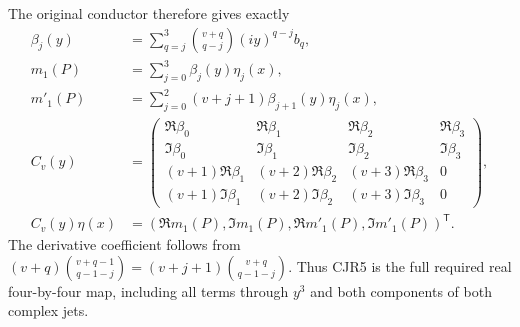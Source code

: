 The original conductor therefore gives exactly
\[
 \begin{split}
 \beta_j(y)&=\sum_{q=j}^3\binom{v+q}{q-j}(iy)^{q-j}b_q,\\
 m_1(P)&=\sum_{j=0}^3\beta_j(y)\eta_j(x),\\
 m'_1(P)&=\sum_{j=0}^2(v+j+1)\beta_{j+1}(y)\eta_j(x),\\
 C_v(y)&=\begin{pmatrix}
 \Re\beta_0&\Re\beta_1&\Re\beta_2&\Re\beta_3\\
 \Im\beta_0&\Im\beta_1&\Im\beta_2&\Im\beta_3\\
 (v+1)\Re\beta_1&(v+2)\Re\beta_2&(v+3)\Re\beta_3&0\\
 (v+1)\Im\beta_1&(v+2)\Im\beta_2&(v+3)\Im\beta_3&0
 \end{pmatrix},\\
 C_v(y)\eta(x)&=(\Re m_1(P),\Im m_1(P),
                         \Re m'_1(P),\Im m'_1(P))^{\mathsf T}.
 \end{split}\tag{CJR5}
\]
The derivative coefficient follows from
$(v+q)\binom{v+q-1}{q-1-j}=(v+j+1)\binom{v+q}{q-1-j}$.
Thus CJR5 is the full required real four-by-four map, including
all terms through $y^3$ and both components of both complex jets.

